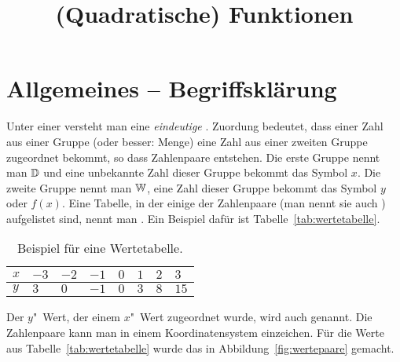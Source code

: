 \documentclass[load-fonts,babel=ngerman]{arbeitsblatt}
\title{(Quadratische) Funktionen}
\begin{document}
\maketitle

\section{Allgemeines -- Begriffsklärung}

Unter einer  versteht man eine \emph{eindeutige}
.  Zuordung bedeutet, dass einer Zahl aus einer Gruppe
(oder besser: Menge) eine Zahl aus einer zweiten Gruppe zugeordnet bekommt, so
dass Zahlenpaare entstehen.  Die erste Gruppe nennt man
 $\mathbb{D}$ und eine unbekannte Zahl dieser
Gruppe bekommt das Symbol $x$.  Die zweite Gruppe nennt man
 $\mathbb{W}$, eine Zahl dieser Gruppe bekommt das Symbol
$y$ oder $f(x)$.  Eine Tabelle, in der einige der Zahlenpaare (man nennt sie
auch ) aufgelistet sind, nennt man .  Ein
Beispiel dafür ist Tabelle~\vref{tab:wertetabelle}.

\begin{table}
  \centering
  \caption{Beispiel für eine Wertetabelle.}
  \label{tab:wertetabelle}
\end{table}

Der $y$"~Wert, der einem $x$"~Wert zugeordnet wurde, wird auch
 genannt.  Die Zahlenpaare kann man in einem
Koordinatensystem einzeichen.  Für die Werte aus
Tabelle~\vref{tab:wertetabelle} wurde das in Abbildung~\vref{fig:wertepaare}
gemacht.
\end{document}
